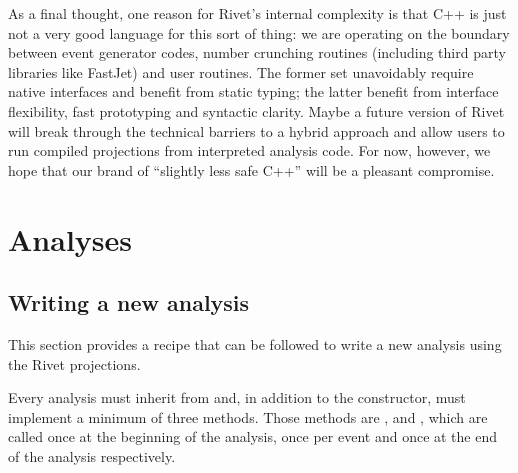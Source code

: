 \begin{philosophy}
  As a final thought, one reason for Rivet's internal complexity is that C++ is
  just not a very good language for this sort of thing: we are operating on the
  boundary between event generator codes, number crunching routines (including
  third party libraries like FastJet) and user routines. The former set
  unavoidably require native interfaces and benefit from static typing; the
  latter benefit from interface flexibility, fast prototyping and syntactic
  clarity. Maybe a future version of Rivet will break through the technical
  barriers to a hybrid approach and allow users to run compiled projections from
  interpreted analysis code. For now, however, we hope that our brand of
  ``slightly less safe C++'' will be a pleasant compromise.
\end{philosophy}







\section{Analyses}

\subsection{Writing a new analysis}

This section provides a recipe that can be followed to write a new analysis
using the Rivet projections.

Every analysis must inherit from  and, in addition to the
constructor, must implement a minimum of three methods.  Those methods are
,  and , which
are called once at the beginning of the analysis, once per event and once at the
end of the analysis respectively.

